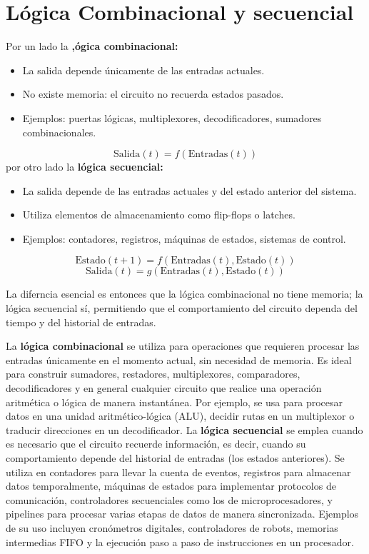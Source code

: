 \section{Lógica Combinacional y secuencial}
Por un lado la \textbf{,ógica combinacional:}
\begin{itemize}
  \item La salida depende únicamente de las entradas actuales.
  \item No existe memoria: el circuito no recuerda estados pasados.
  \item Ejemplos: puertas lógicas, multiplexores, decodificadores, sumadores combinacionales.
\end{itemize}

\[
\text{Salida}(t) = f(\text{Entradas}(t))
\]
por otro lado la \textbf{lógica secuencial:}
\begin{itemize}
  \item La salida depende de las entradas actuales y del estado anterior del sistema.
  \item Utiliza elementos de almacenamiento como flip-flops o latches.
  \item Ejemplos: contadores, registros, máquinas de estados, sistemas de control.
\end{itemize}

\[
\text{Estado}(t+1) = f(\text{Entradas}(t), \text{Estado}(t))
\]
\[
\text{Salida}(t) = g(\text{Entradas}(t), \text{Estado}(t))
\]

La diferncia esencial es entonces que la lógica combinacional no tiene memoria; la lógica secuencial sí, permitiendo que el comportamiento del circuito dependa del tiempo y del historial de entradas.

La \textbf{lógica combinacional} se utiliza para operaciones que requieren procesar las entradas únicamente en el momento actual, sin necesidad de memoria. Es ideal para construir sumadores, restadores, multiplexores, comparadores, decodificadores y en general cualquier circuito que realice una operación aritmética o lógica de manera instantánea. Por ejemplo, se usa para procesar datos en una unidad aritmético-lógica (ALU), decidir rutas en un multiplexor o traducir direcciones en un decodificador. La \textbf{lógica secuencial} se emplea cuando es necesario que el circuito recuerde información, es decir, cuando su comportamiento depende del historial de entradas (los estados anteriores). Se utiliza en contadores para llevar la cuenta de eventos, registros para almacenar datos temporalmente, máquinas de estados para implementar protocolos de comunicación, controladores secuenciales como los de microprocesadores, y pipelines para procesar varias etapas de datos de manera sincronizada. Ejemplos de su uso incluyen cronómetros digitales, controladores de robots, memorias intermedias FIFO y la ejecución paso a paso de instrucciones en un procesador.


